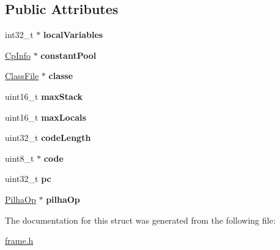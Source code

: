 \subsection*{Public Attributes}
\begin{DoxyCompactItemize}
\item 
\mbox{\label{structFrame_a9047c9524d44fc81cb6311de8a2a8b77}} 
int32\+\_\+t $\ast$ {\bfseries local\+Variables}
\item 
\mbox{\label{structFrame_a8067fdcfa9b9b35c39434ed4689b3aea}} 
\mbox{\hyperlink{structCpInfo}{Cp\+Info}} $\ast$ {\bfseries constant\+Pool}
\item 
\mbox{\label{structFrame_a3ce27d5278d61a0abaeca31956febc1f}} 
\mbox{\hyperlink{structClassFile}{Class\+File}} $\ast$ {\bfseries classe}
\item 
\mbox{\label{structFrame_a378c00e14ef1f63cbbfa4e984502b652}} 
uint16\+\_\+t {\bfseries max\+Stack}
\item 
\mbox{\label{structFrame_a5d933cb41bf8f544aecba4ef1723ab1a}} 
uint16\+\_\+t {\bfseries max\+Locals}
\item 
\mbox{\label{structFrame_a1ed982d1a0902c22374fcde6a8938b69}} 
uint32\+\_\+t {\bfseries code\+Length}
\item 
\mbox{\label{structFrame_a9de8be272246d00c7a0c2ddc899fe8f2}} 
uint8\+\_\+t $\ast$ {\bfseries code}
\item 
\mbox{\label{structFrame_a91e50d2091184efb52b6d7c0c21fd4b2}} 
uint32\+\_\+t {\bfseries pc}
\item 
\mbox{\label{structFrame_addbe682d4328100186a4c03da7c2b9a2}} 
\mbox{\hyperlink{structPilhaOp}{Pilha\+Op}} $\ast$ {\bfseries pilha\+Op}
\end{DoxyCompactItemize}


The documentation for this struct was generated from the following file\+:\begin{DoxyCompactItemize}
\item 
\mbox{\hyperlink{frame_8h}{frame.\+h}}\end{DoxyCompactItemize}
